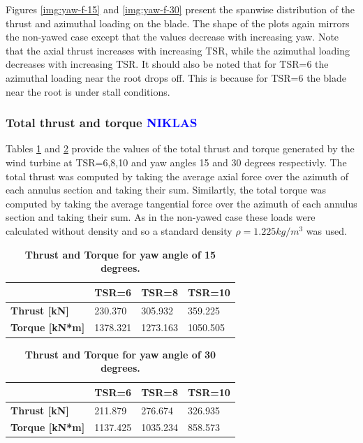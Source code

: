 Figures \ref{img:yaw-f-15} and \ref{img:yaw-f-30} present the spanwise distribution of the thrust and azimuthal loading on the blade. The shape of the plots again mirrors the non-yawed case except that the values decrease with increasing yaw. Note that the axial thrust increases with increasing TSR, while the azimuthal loading decreases with increasing TSR. It should also be noted that for TSR=6 the azimuthal loading near the root drops off. This is because for TSR=6 the blade near the root is under stall conditions.

\subsubsection{\textbf{Total thrust and torque} \textcolor{blue}{NIKLAS}}
Tables \ref{tbl:thrust-15} and \ref{tbl:thrust-30} provide the values of the total thrust and torque generated by the wind turbine at TSR=6,8,10 and yaw angles 15 and 30 degrees respectivly. The total thrust was computed by taking the average axial force over the azimuth of each annulus section and taking their sum. Similartly, the total torque was computed by taking the average tangential force over the azimuth of each annulus section and taking their sum. As in the non-yawed case these loads were calculated without density and so a standard density $\rho = 1.225 kg/m^3$ was used.
\begin{table}[h]
\caption{\textbf{Thrust and Torque for yaw angle of 15 degrees.}}
\begin{tabular}{|l|l|l|l|}
\hline
   & \textbf{TSR=6} & \textbf{TSR=8} & \textbf{TSR=10}  \\ \hline
\textbf{Thrust {[}kN{]}} &   230.370    &  305.932    &   359.225     \\ \hline
\textbf{Torque {[}kN*m{]}} &  1378.321   &  1273.163     &   1050.505     \\ \hline
\end{tabular}
\label{tbl:thrust-15}
\end{table}

\begin{table}[h]
\caption{\textbf{Thrust and Torque for yaw angle of 30 degrees.}}
\begin{tabular}{|l|l|l|l|}
\hline
   & \textbf{TSR=6} & \textbf{TSR=8} & \textbf{TSR=10}  \\ \hline
\textbf{Thrust {[}kN{]}} &   211.879    &  276.674     &   326.935     \\ \hline
\textbf{Torque {[}kN*m{]}} &   1137.425    &  1035.234     &   858.573     \\ \hline
\end{tabular}
\label{tbl:thrust-30}
\end{table}

